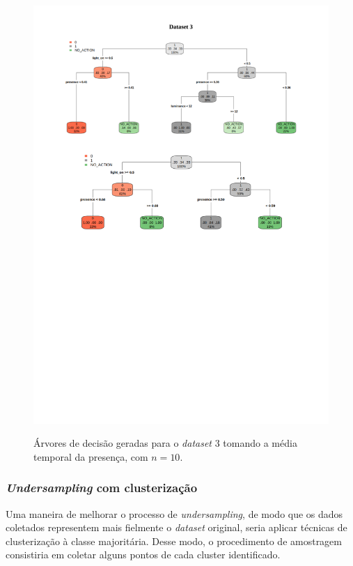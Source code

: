\begin{figure}[hp]
	\centering
	\caption{Árvores de decisão geradas para o \textit{dataset} 3 tomando a média temporal da presença, com $n=10$.}
  \includegraphics[width=\textwidth]{imagens/teste_learning/5_3.pdf}
  \label{fig:teste_5_3}  
\end{figure}

\clearpage

\subsubsection{\textit{Undersampling} com clusterização}
Uma maneira de melhorar o processo de \textit{undersampling}, de modo que os dados coletados representem mais fielmente o \textit{dataset} original, seria aplicar técnicas de clusterização à classe majoritária. Desse modo, o procedimento de amostragem consistiria em coletar alguns pontos de cada cluster identificado.

